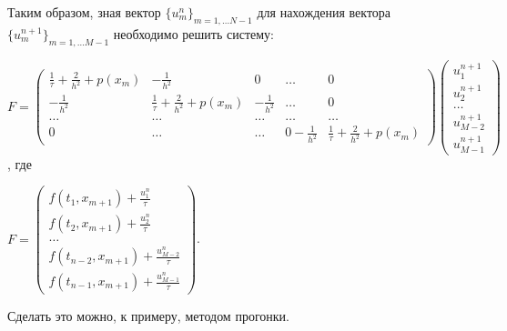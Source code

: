 \documentclass[14pt,a4paper]{extarticle}
\newcommand{\1}{\mathbbm{1}}
\begin{document}
Таким образом, зная вектор $\{u_m^n\}_{m = 1, \ldots N-1}$ для нахождения вектора $\{u_m^{n+1}\}_{m = 1, \ldots M-1}$ необходимо решить систему:

$F = \begin{pmatrix}
    \frac{1}{\tau} + \frac{2}{h^2} + p(x_m)  &   -\frac{1}{h^2}                           & 0               & \ldots & 0 \\
    -\frac{1}{h^2}                           &   \frac{1}{\tau} + \frac{2}{h^2} + p(x_m)  & -\frac{1}{h^2}  & \ldots & 0  \\
    \ldots  &\ldots  &   \ldots  & \ldots  & \ldots \\
    0 & \ldots & \ldots & 0 -\frac{1}{h^2}  &   \frac{1}{\tau} + \frac{2}{h^2} + p(x_m) 
\end{pmatrix}
\begin{pmatrix}
    u_1^{n + 1} \\
    u_2^{n + 1} \\
    \ldots \\
    u_{M-2}^{n+1} \\
    u_{M-1}^{n+1}
\end{pmatrix}$, 
где

$F=
\begin{pmatrix}
    f(t_{1}, x_{m+1}) + \frac{u_1^{n}}{\tau} \\
    f(t_{2}, x_{m+1}) + \frac{u_2^{n}}{\tau} \\
    \ldots \\
    f(t_{n-2}, x_{m+1}) + \frac{u_{M-2}^{n}}{\tau} \\
    f(t_{n-1}, x_{m+1}) + \frac{u_{M-1}^{n}}{\tau}
\end{pmatrix}$.



Сделать это можно, к примеру, методом прогонки.
\end{document}
